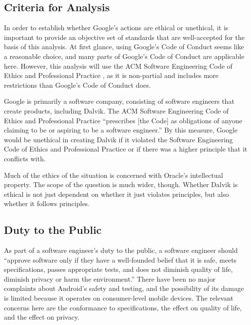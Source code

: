 \documentclass[11pt]{article}
\begin{document}
\begin{multicols}{2}
\subsection{Criteria for Analysis} %
\label{sub:criteria}

In order to establish whether Google's actions are ethical or unethical, it is
important to provide an objective set of standards that are well-accepted for
the basis of this analysis.  At first glance, using Google's Code of Conduct
\cite{google-conduct} seems like a reasonable choice, and many parts of Google's
Code of Conduct are applicable here.  However, this analysis will use the ACM
Software Engineering Code of Ethics and Professional Practice \cite{secode}, as
it is non-partial and includes more restrictions than Google's Code of Conduct
does.

Google is primarily a software company, consisting of software engineers that
create products, including Dalvik.  The ACM Software Engineering Code of Ethics
and Professional Practice ``prescribes [the Code] as obligations of anyone
claiming to be or aspiring to be a software engineer.'' \cite{secode} By this
measure, Google would be unethical in creating Dalvik if it violated the
Software Engineering Code of Ethics and Professional Practice \cite{secode} or
if there was a higher principle that it conflicts with.

Much of the ethics of the situation is concerned with Oracle's intellectual
property.  The scope of the question is much wider, though.  Whether Dalvik is
ethical is not just dependent on whether it just violates principles, but also
whether it follows principles.


\subsection{Duty to the Public} %
\label{sub:product}

As part of a software engineer's duty to the public, a software engineer should
``approve software only if they have a well-founded belief that it is safe,
meets specifications, passes appropriate tests, and does not diminish quality of
life, diminish privacy or harm the environment.'' \cite[\S~1.03]{secode}  There
have been no major complaints about Android's safety and testing, and the
possibility of its damage is limited because it operates on consumer-level
mobile devices.  The relevant concerns here are the conformance to
specifications, the effect on quality of life, and the effect on privacy.


\end{multicols}
\end{document}
